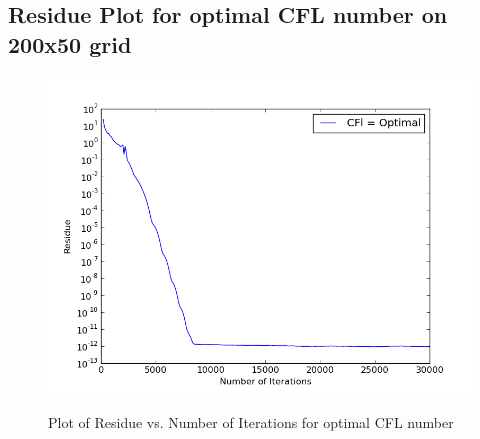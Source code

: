 \documentclass{article}
\begin{document}
\subsection*{Residue Plot for optimal CFL number on 200x50 grid}
\begin{figure}[H]   \label{figure}
\includegraphics[width=15cm]{best.png}		%
\label{figure:}
\caption{Plot of Residue vs. Number of Iterations for optimal CFL number}
\end{figure}
\end{document}
